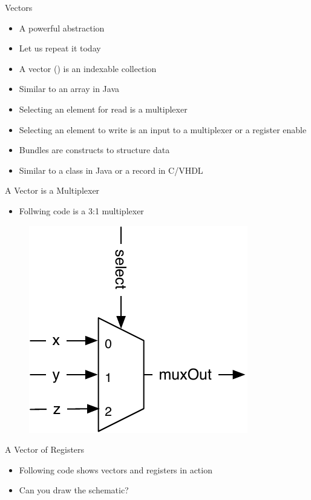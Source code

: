 \begin{frame}[fragile]{Vectors}
\begin{itemize}
\item A powerful abstraction
\item Let us repeat it today
\item A vector () is an indexable collection
\item Similar to an array in Java
\item Selecting an element for read is a multiplexer
\item Selecting an element to write is an input to a multiplexer or a register enable
\item Bundles are constructs to structure data
\item Similar to a class in Java or a record in C/VHDL
\end{itemize}
\end{frame}

\begin{frame}[fragile]{A Vector is a Multiplexer}
\begin{itemize}
\item Follwing code is a 3:1 multiplexer
\end{itemize}
\begin{figure}
  \includegraphics[scale=0.6]{../figures/vec-mux}
\end{figure}
\end{frame}

\begin{frame}[fragile]{A Vector of Registers}
\begin{itemize}
\item Following code shows vectors and registers in action
\end{itemize}
\begin{itemize}
\item Can you draw the schematic?
\end{itemize}
\end{frame}

